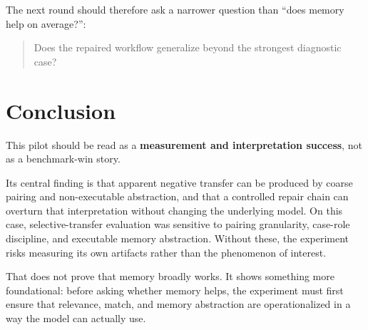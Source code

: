 \documentclass[11pt]{article}
\begin{document}
The next round should therefore ask a narrower question than ``does memory help on average?'':

\begin{quote}
Does the repaired workflow generalize beyond the strongest diagnostic case?
\end{quote}

\section{Conclusion}

This pilot should be read as a \textbf{measurement and interpretation success}, not as a benchmark-win story.

Its central finding is that apparent negative transfer can be produced by coarse pairing and non-executable abstraction, and that a controlled repair chain can overturn that interpretation without changing the underlying model. On this case, selective-transfer evaluation was sensitive to pairing granularity, case-role discipline, and executable memory abstraction. Without these, the experiment risks measuring its own artifacts rather than the phenomenon of interest.

That does not prove that memory broadly works. It shows something more foundational: before asking whether memory helps, the experiment must first ensure that relevance, match, and memory abstraction are operationalized in a way the model can actually use.

\appendix

\end{document}
